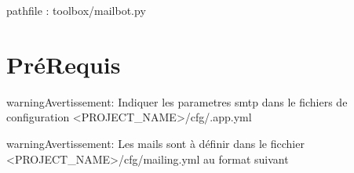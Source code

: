 \documentclass[letterpaper,10pt,french]{sphinxmanual}
\begin{document}
pathfile : toolbox/mailbot.py


\section{Pré\sphinxhyphen{}Requis}
\label{\detokenize{classes/cfgloader:pre-requis}}
\begin{sphinxadmonition}{warning}{Avertissement:}
Indiquer les parametres smtp dans le fichiers de configuration \textless{}PROJECT\_NAME\textgreater{}/cfg/.app.yml
\end{sphinxadmonition}

\begin{sphinxVerbatim}[commandchars=\\\{\}]
  
  
  
  
  
\end{sphinxVerbatim}

\begin{sphinxadmonition}{warning}{Avertissement:}
Les mails sont à définir dans le ficchier \textless{}PROJECT\_NAME\textgreater{}/cfg/mailing.yml au format suivant
\end{sphinxadmonition}
\end{document}
